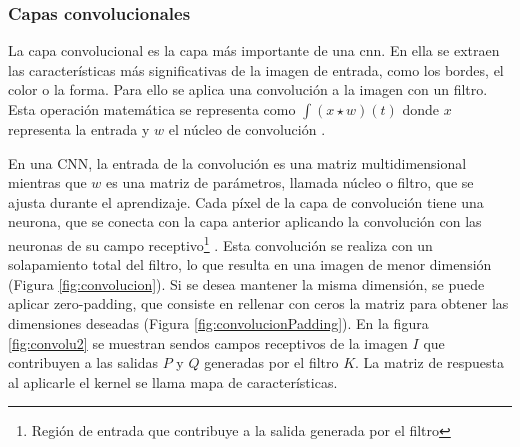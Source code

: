 \subsubsection*{Capas convolucionales}

La capa convolucional es la capa más importante de una \acrshort{cnn}. En ella se extraen las características más significativas de la imagen de entrada, como los bordes, el color o la forma. Para ello se aplica una convolución a la imagen con un filtro. Esta operación matemática se representa como \( \int (x \star w)(t) \) donde $x$ representa la entrada y $w$ el núcleo de convolución \citep{pajares2021aprendizaje}.



En una CNN, la entrada de la convolución es una matriz multidimensional mientras que $w$ es una matriz de parámetros, llamada núcleo o filtro, que se ajusta durante el aprendizaje.
Cada píxel de la capa de convolución tiene una neurona, que se conecta con la capa anterior aplicando la convolución con las neuronas de su campo receptivo\footnote{Región de entrada que contribuye a la salida generada por el filtro} \cite{geron2022hands}. Esta convolución se realiza con un solapamiento total del filtro, lo que resulta en una imagen de menor dimensión (Figura \ref{fig:convolucion}). Si se desea mantener la misma dimensión, se puede aplicar zero-padding, que consiste en rellenar con ceros la matriz para obtener las dimensiones deseadas (Figura \ref{fig:convolucionPadding}). En la figura \ref{fig:convolu2} se muestran sendos campos receptivos de la imagen \( I \) que contribuyen a las salidas \( P \) y \( Q \) generadas por el filtro \( K \). La matriz de respuesta al aplicarle el kernel se llama mapa de características.

